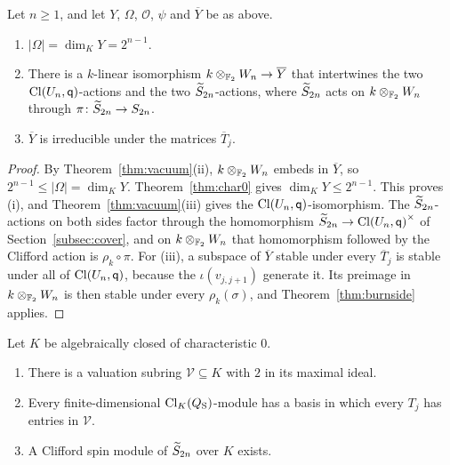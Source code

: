 \begin{theorem}\label{thm:reduction}
Let $n\ge1$, and let $Y$, $\Omega$, $\mathcal O$, $\psi$ and $\overline{Y}$ be as above.
\begin{enumerate}
\item $|\Omega|=\dim_{K}Y=2^{n-1}$.
\item There is a $k$-linear isomorphism $k\otimes_{\mathbb{F}_2}W_n\to\overline{Y}$ that intertwines the two $\operatorname{Cl}(U_n,\mathsf{q})$-actions and the two $\widetilde{S}_{2n}$-actions, where $\widetilde{S}_{2n}$ acts on $k\otimes_{\mathbb{F}_2}W_n$ through $\pi\colon\widetilde{S}_{2n}\to S_{2n}$.
\item $\overline{Y}$ is irreducible under the matrices $\overline{T}_j$.
\end{enumerate}
\end{theorem}

\begin{proof}
By Theorem~\ref{thm:vacuum}(ii), $k\otimes_{\mathbb{F}_2}W_n$ embeds in $\overline{Y}$, so $2^{n-1}\le|\Omega|=\dim_{K}Y$. Theorem~\ref{thm:char0} gives $\dim_{K}Y\le2^{n-1}$. This proves (i), and Theorem~\ref{thm:vacuum}(iii) gives the $\operatorname{Cl}(U_n,\mathsf{q})$-isomorphism. The $\widetilde{S}_{2n}$-actions on both sides factor through the homomorphism $\widetilde{S}_{2n}\to{\operatorname{Cl}(U_n,\mathsf{q})}^\times$ of Section~\ref{subsec:cover}, and on $k\otimes_{\mathbb{F}_2}W_n$ that homomorphism followed by the Clifford action is $\rho_k\circ\pi$. For (iii), a subspace of $\overline{Y}$ stable under every $\overline{T}_j$ is stable under all of $\operatorname{Cl}(U_n,\mathsf{q})$, because the $\iota(v_{j,j+1})$ generate it. Its preimage in $k\otimes_{\mathbb{F}_2}W_n$ is then stable under every $\rho_k(\sigma)$, and Theorem~\ref{thm:burnside} applies.
\end{proof}

\begin{proposition}\label{prop:lattice}
Let $K$ be algebraically closed of characteristic $0$.
\begin{enumerate}
\item There is a valuation subring $\mathcal V\subseteq K$ with $2$ in its maximal ideal.
\item Every finite-dimensional $\operatorname{Cl}_K(Q_{\mathrm S})$-module has a basis in which every $T_j$ has entries in $\mathcal V$.
\item A Clifford spin module of $\widetilde{S}_{2n}$ over $K$ exists.
\end{enumerate}
\end{proposition}

